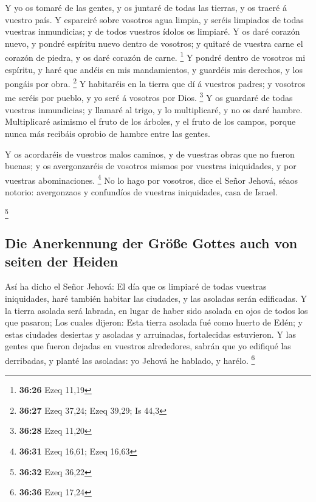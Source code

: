  Y yo os tomaré de las gentes, y os juntaré de todas las
tierras, y os traeré á vuestro país.  Y esparciré sobre
vosotros agua limpia, y seréis limpiados de todas vuestras inmundicias;
y de todos vuestros ídolos os limpiaré.  Y os daré
corazón nuevo, y pondré espíritu nuevo dentro de vosotros; y quitaré de
vuestra carne el corazón de piedra, y os daré corazón de carne.
\footnote{\textbf{36:26} Ezeq 11,19}  Y pondré dentro de
vosotros mi espíritu, y haré que andéis en mis mandamientos, y guardéis
mis derechos, y los pongáis por obra. \footnote{\textbf{36:27} Ezeq
  37,24; Ezeq 39,29; Is 44,3}  Y habitaréis en la tierra
que dí á vuestros padres; y vosotros me seréis por pueblo, y yo seré á
vosotros por Dios. \footnote{\textbf{36:28} Ezeq 11,20} 
Y os guardaré de todas vuestras inmundicias; y llamaré al trigo, y lo
multiplicaré, y no os daré hambre.  Multiplicaré asimismo
el fruto de los árboles, y el fruto de los campos, porque nunca más
recibáis oprobio de hambre entre las gentes.

 Y os acordaréis de vuestros malos caminos, y de vuestras
obras que no fueron buenas; y os avergonzaréis de vosotros mismos por
vuestras iniquidades, y por vuestras abominaciones. \footnote{\textbf{36:31}
  Ezeq 16,61; Ezeq 16,63}  No lo hago por vosotros, dice
el Señor Jehová, séaos notorio: avergonzaos y confundíos de vuestras
iniquidades, casa de Israel.

\footnote{\textbf{36:32} Ezeq 36,22}

\hypertarget{die-anerkennung-der-gruxf6uxdfe-gottes-auch-von-seiten-der-heiden}{%
\subsection{Die Anerkennung der Größe Gottes auch von seiten der
Heiden}\label{die-anerkennung-der-gruxf6uxdfe-gottes-auch-von-seiten-der-heiden}}

 Así ha dicho el Señor Jehová: El día que os limpiaré de
todas vuestras iniquidades, haré también habitar las ciudades, y las
asoladas serán edificadas.  Y la tierra asolada será
labrada, en lugar de haber sido asolada en ojos de todos los que
pasaron;  Los cuales dijeron: Esta tierra asolada fué
como huerto de Edén; y estas ciudades desiertas y asoladas y arruinadas,
fortalecidas estuvieron.  Y las gentes que fueron dejadas
en vuestros alrededores, sabrán que yo edifiqué las derribadas, y planté
las asoladas: yo Jehová he hablado, y harélo. \footnote{\textbf{36:36}
  Ezeq 17,24}


